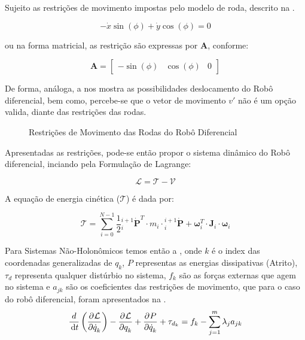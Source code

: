 Sujeito as restrições de movimento impostas pelo modelo de roda, descrito na .

\begin{equation}
    -\dot{x}\sin(\phi) + \dot{y}\cos(\phi) = 0
    \label{eq:rstricoes}
\end{equation}

\noindent ou na forma matricial, as restrição são expressas por $\textbf{A}$, conforme:

\begin{equation}
    \mathbf{A} = 
    \begin{bmatrix}
        - \sin(\phi) & \cos(\phi) & 0
    \end{bmatrix}
    \label{eq:rstricoesmat}
\end{equation}

De forma, análoga, a  nos mostra as possibilidades deslocamento do Robô diferencial, bem como, percebe-se que o vetor de movimento $v'$ não é um opção valida, 
diante das restrições das rodas.

\begin{figure}[!ht]
    \centering
    
    \caption{Restrições de Movimento das Rodas do Robô Diferencial}
    \label{fig:gocar}
\end{figure}

Apresentadas as restrições, pode-se então propor o sistema dinâmico do Robô diferencial, inciando pela Formulação de Lagrange:

\begin{equation*}
    \mathcal{L}= \mathcal{T} - \mathcal{V}
\end{equation*}

A equação de energia cinética ($\mathcal{T}$) é dada por:

\begin{equation}
    \mathcal{T} = \sum\limits_{i=0}^{N-1} \frac{1}{2} {}_{i}^{i+1}\dot{\mathbf{P}}^T\cdot m_{i}\cdot {}_{i}^{i+1}\dot{\mathbf{P}}+ \mathbf{\omega}_i^T\cdot \mathbf{J}_i \cdot \mathbf{\omega}_i
\end{equation}


Para Sistemas Não-Holonômicos temos então a , onde $k$ é o index das coordenadas generalizadas de $q_k$, $P$ representas as energias dissipativas (Atrito),
$\tau_d$ representa qualquer distúrbio no sistema, $f_k$ são as forças externas que agem no sistema e $a_{jk}$ são os coeficientes das restrições de movimento, que para o caso do 
robô diferencial, foram apresentados na .
\begin{equation}
    \frac{d}{\df{t}}\left( \parcial{}{\mathcal{L}}{\dot{q}_k}\right)
    -\parcial{}{\mathcal{L}}{q_k} 
    + \parcial{}{P}{\dot{q}_k}
    +\tau_{d_k}
    = f_k - \sum\limits^{m}_{j=1}\lambda_j a_{jk}
    \label{eq:lagrangenonhomo}
\end{equation}

